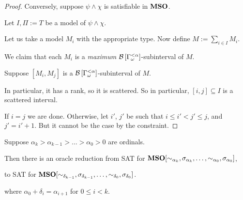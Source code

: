 \begin{proof}
  Conversely, suppose $\psi \land \chi$ is satisfiable in $\mathbf{MSO}$.

  Let $I, \Pi := T$ be a model of $\psi \land \chi$.

  Let us take a model $M_i$ with the appropriate type.
  Now define $M := \sum_{i \in I} M_i$.

  We claim that each $M_i$ is a \emph{maximum} $\mathcal{B} \left[ {{\Gamma_{\omega}^{< \alpha}}} \right]$-subinterval
  of $M$.

  Suppose $[M_i, M_j]$ is a $\mathcal{B} \left[ {{\Gamma_{\omega}^{< \alpha}}} \right]$-subinterval of $M$.

  In particular, it has a rank, so it is scattered. So in particular,
  $[i, j] \subseteq I$ is a scattered interval.

  If $i = j$ we are done. Otherwise, let $i'$, $j'$ be such that $i \le i' < j' \le j$,
  and $j' = i' + 1$.  But it cannot be the case by the constraint.


\end{proof}

\begin{theorem}
  Suppose $\alpha_k > \alpha_{k - 1} > \ldots > \alpha_0 > 0$ are ordinals.

  Then there is an oracle reduction from SAT for $\mathbf{MSO}[
      \sim_{\alpha_k}, \sigma_{\alpha_k}, \ldots, \sim_{\alpha_0}, \sigma_{\alpha_0}]$,

  to SAT for $\mathbf{MSO}[
      \sim_{\delta_{k-1}}, \sigma_{\delta_{k-1}}, \ldots, \sim_{\delta_0}, \sigma_{\delta_0}]$.

  where $\alpha_0 + \delta_i = \alpha_{i + 1}$ for $0 \le i < k$.
\end{theorem}

